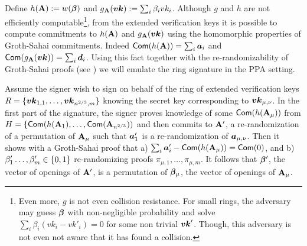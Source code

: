 Define $h(\mathbf{{A}}):=w({\boldsymbol{\beta}})$ and $g_{\mathbf{{A}}}({\boldsymbol{vk}}) := \sum_i \beta_i vk_i$.
Although $g$ and $h$ are not efficiently computable\footnote{Even more, $g$ is not even collision resistance. For small rings, the adversary may guess ${\boldsymbol{\beta}}$ with non-negligible probability and solve $\sum_i\beta_i(vk_i-vk'_i)=0$ for some non trivial ${\boldsymbol{vk}}'$. Though, this adversary is not even not aware that it has found a collision.}, from the extended verification keys it is possible to compute commitments to $h(\mathbf{{A}})$ and $g_{\mathbf{{A}}}({\boldsymbol{vk}})$ using the homomorphic properties of Groth-Sahai commitments. Indeed $\mathsf{Com}(h(\mathbf{{A}})) = \sum_i {\boldsymbol{a}}_i$ and $\mathsf{Com}(g_{\mathbf{{A}}}({\boldsymbol{vk}})) = \sum_i {\boldsymbol{d}}_i$. Using this fact together with the re-randomizability of Groth-Sahai proofs (see \cite{C:BCCKLS09}) we will emulate the ring signature in the PPA setting.

Assume the signer wish to sign on behalf of the ring of extended verification keys $R=\{{\boldsymbol{vk}}_{1,1},\ldots,{\boldsymbol{vk}}_{n^{2/3},m}\}$ knowing the secret key corresponding to ${\boldsymbol{vk}}_{\mu,\nu}$.
In the first part of the signature, the signer proves knowledge of some $\mathsf{Com}(h(\mathbf{{A}}_\mu))$ from $H = \{\mathsf{Com}(h(\mathbf{{A}}_1),\ldots,\mathsf{Com}(\mathbf{{A}}_{n^{2/3}}))$ and then commits to $\mathbf{{A}}'$, a re-ran\-do\-mi\-za\-tion of a permutation of $\mathbf{{A}}_\mu$ such that ${\boldsymbol{a}}'_1$ is a re-randomization of ${\boldsymbol{a}}_{\mu,\nu}$. Then it shows with a Groth-Sahai proof that a) $\sum_i {\boldsymbol{a}}'_i - \mathsf{Com}(h(\mathbf{{A}}_\mu)) = \mathsf{Com}(0)$, and b) $\beta'_1\ldots,\beta'_m\in\{0,1\}$ re-randomizing proofs $\pi_{\mu,1},\ldots,\pi_{\mu,m}$. It follows that ${\boldsymbol{\beta}}'$, the vector of openings of $\mathbf{{A}}'$, is a permutation of ${\boldsymbol{\beta}}_\mu$, the vector of openings of $\mathbf{{A}}_\mu$.

